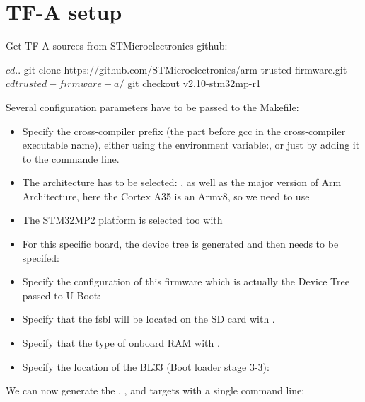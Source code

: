 \section{TF-A setup}

Get TF-A sources from STMicroelectronics github:
\begin{bashinput}
$ cd ..
$ git clone https://github.com/STMicroelectronics/arm-trusted-firmware.git
$ cd trusted-firmware-a/
$ git checkout v2.10-stm32mp-r1
\end{bashinput}

Several configuration parameters have to be passed to the Makefile:
\begin{itemize}
\item Specify the cross-compiler prefix (the part before gcc in the
      cross-compiler executable name), either using the environment
      variable:, or just by
      adding it to the  commande line.
\item The architecture has to be selected: , as
      well as the major version of Arm Architecture, here the Cortex A35 is
      an Armv8, so we need to use 
\item The STM32MP2 platform is selected too with 
\item For this specific board, the device tree is generated and then
      needs to be specifed: 
\item Specify the configuration of this firmware which is actually
      the Device Tree passed to U-Boot:
\item Specify that the fsbl will be located on the SD
      card with .
\item Specify that the type of onboard RAM with .
\item Specify the location of the BL33 (Boot loader stage 3-3):
\end{itemize}

We can now generate the , , and  targets
with a single command line:

